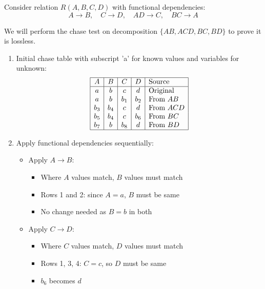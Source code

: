 \documentclass{article}
\begin{document}
    \begin{example}
      Consider relation $R(A,B,C,D)$ with functional dependencies:
      \[ A \rightarrow B, \quad C \rightarrow D, \quad AD \rightarrow C, \quad BC \rightarrow A \]

      We will perform the chase test on decomposition $\{AB, ACD, BC, BD\}$ to prove it is lossless.

      \begin{enumerate}
      \item Initial chase table with subscript 'a' for known values and variables for unknown:
          \[
          \begin{array}{|c|c|c|c|l|}
          \hline
          A & B & C & D & \text{Source} \\
          \hline
          a & b & c & d & \text{Original} \\
          a & b & b_1 & b_2 & \text{From }AB \\
          b_3 & b_4 & c & d & \text{From }ACD \\
          b_5 & b_4 & c & b_6 & \text{From }BC \\
          b_7 & b & b_8 & d & \text{From }BD \\
          \hline
          \end{array}
          \]

      \item Apply functional dependencies sequentially:

          \begin{itemize}
          \item Apply $A \rightarrow B$:
              \begin{itemize}
              \item Where $A$ values match, $B$ values must match
              \item Rows 1 and 2: since $A=a$, $B$ must be same
              \item No change needed as $B=b$ in both
              \end{itemize}

          \item Apply $C \rightarrow D$:
              \begin{itemize}
              \item Where $C$ values match, $D$ values must match
              \item Rows 1, 3, 4: $C=c$, so $D$ must be same
              \item $b_6$ becomes $d$
              \end{itemize}


\end{itemize}
\end{enumerate}
\end{example}
\end{document}

